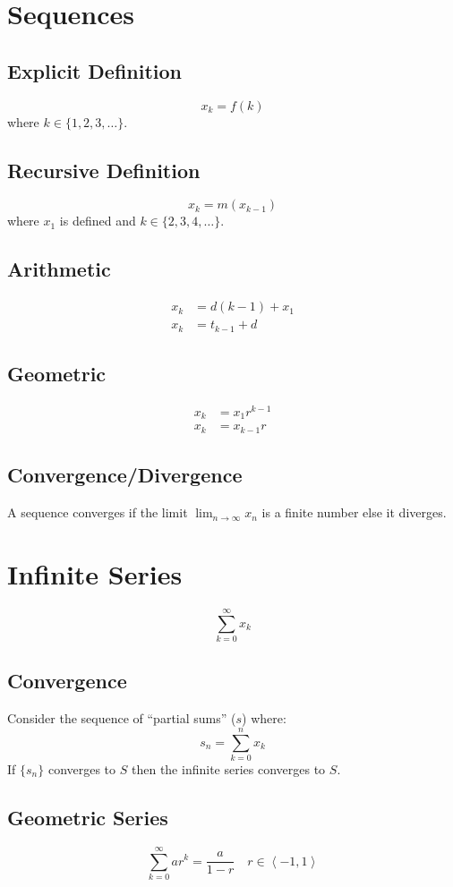 \documentclass[12pt]{article}
\newcommand*{\rmaskip}{\setlength{\abovedisplayskip}{0pt}}
\newcommand*{\rmbskip}{\setlength{\belowdisplayskip}{0pt}}
\newcommand*{\rmskip}{\rmaskip \rmbskip}
\newcommand*{\isum}[1][k]{\sum_{#1=0}^\infty}
\begin{document}
\section*{Sequences}
\subsection*{Explicit Definition}
\[
  x_k = f(k)
\]
where \(k \in \{1,2,3,\dots\}\).
\subsection*{Recursive Definition}
\[
  x_k = m(x_{k-1})
\]
where \(x_1\) is defined and \(k \in \{2,3,4,\dots\}\).
\subsection*{Arithmetic}
{\rmskip\begin{align*}
  x_k &= d(k-1) + x_1\\
  x_k &= t_{k-1} + d
\end{align*}}%
\subsection*{Geometric}
{\rmskip\begin{align*}
  x_k &= x_1r^{k-1}\\
  x_k &= x_{k-1} r
\end{align*}}%
\subsection*{Convergence\slash Divergence}
A sequence converges if the limit \(\displaystyle\lim_{n \to \infty} x_n\) is
a finite number else it diverges.
\section*{Infinite Series}
\[
  \isum x_k
\]
\subsection*{Convergence}
Consider the sequence of ``partial sums'' (\(s\)) where:
\[
  s_n = \sum_{k=0}^n x_k
\]
If \(\{s_n\}\) converges to \(S\) then the infinite series converges to \(S\).
\subsection*{Geometric Series}
\[
  \isum ar^{k} = \frac{a}{1-r} \quad r \in \left<-1,1\right>
\]
\end{document}
